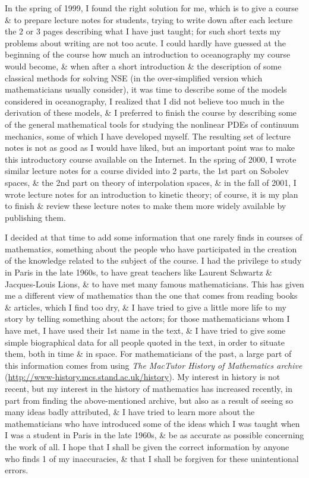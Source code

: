 \documentclass{article}
\begin{document}
\begin{enumerate}
	In the spring of 1999, I found the right solution for me, which is to give a course \& to prepare lecture notes for students, trying to write down after each lecture the 2 or 3 pages describing what I have just taught; for such short texts my problems about writing are not too acute. I could hardly have guessed at the beginning of the course how much an introduction to oceanography my course would become, \& when after a short introduction \& the description of some classical methods for solving NSE (in the over-simplified version which mathematicians usually consider), it was time to describe some of the models considered in oceanography, I realized that I did not believe too much in the derivation of these models, \& I preferred to finish the course by describing some of the general mathematical tools for studying the nonlinear PDEs of continuum mechanics, some of which I have developed myself. The resulting set of lecture notes is not as good as I would have liked, but an important point was to make this introductory course available on the Internet. In the spring of 2000, I wrote similar lecture notes for a course divided into 2 parts, the 1st part on Sobolev spaces, \& the 2nd part on theory of interpolation spaces, \& in the fall of 2001, I wrote lecture notes for an introduction to kinetic theory; of course, it is my plan to finish \& review these lecture notes to make them more widely available by publishing them.
	
	I decided at that time to add some information that one rarely finds in courses of mathematics, something about the people who have participated in the creation of the knowledge related to the subject of the course. I had the privilege to study in Paris in the late 1960s, to have great teachers like {\sc Laurent Schwartz \& Jacques-Louis Lions}, \& to have met many famous mathematicians. This has given me a different view of mathematics than the one that comes from reading books \& articles, which I find too dry, \& I have tried to give a little more life to my story by telling something about the actors; for those mathematicians whom I have met, I have used their 1st name in the text, \& I have tried to give some simple biographical data for all people quoted in the text, in order to situate them, both in time \& in space. For mathematicians of the past, a large part of this information comes from using {\it The MacTutor History of Mathematics archive} (\url{http://www-history.mcs.stand.ac.uk/history}). My interest in history is not recent, but my interest in the history of mathematics has increased recently, in part from finding the above-mentioned archive, but also as a result of seeing so many ideas badly attributed, \& I have tried to learn more about the mathematicians who have introduced some of the ideas which I was taught when I was a student in Paris in the late 1960s, \& be as accurate as possible concerning the work of all. I hope that I shall be given the correct information by anyone who finds 1 of my inaccuracies, \& that I shall be forgiven for these unintentional errors.
	

\end{enumerate}
\end{document}
